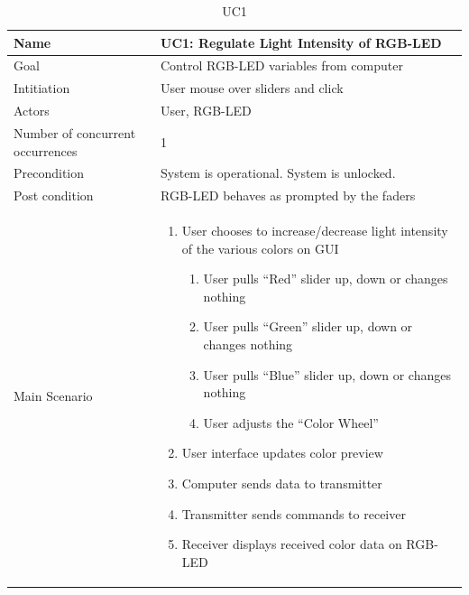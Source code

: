 \documentclass[oneside]{memoir}
\begin{document}
\begin{table}[]
\centering
\caption{UC1}
\label{my-label}
\begin{tabularx}{\textwidth}{|l X|} 
\hline
Name                             & UC1: Regulate Light Intensity of RGB-LED   \\ \hline
Goal                             & Control RGB-LED variables from computer    \\ \hline
Intitiation                      & User mouse over sliders and click          \\ \hline
Actors                           & User, RGB-LED                              \\ \hline
Number of concurrent occurrences & 1                                          \\ \hline
Precondition                     & System is operational. System is unlocked. \\ \hline
Post condition                   & RGB-LED behaves as prompted by the faders  \\ \hline
Main Scenario                    & 
                                 
                                    \begin{enumerate} 
                                 \item User chooses to increase/decrease light intensity of the various colors on GUI 
                              \begin{enumerate}[label*=\arabic*.]
                                \item User pulls “Red” slider up, down or changes nothing
                                \item User pulls “Green” slider up, down or changes nothing
                                \item User pulls “Blue” slider up, down or changes nothing
                                \item User adjusts the “Color Wheel”
                                        \end{enumerate}
                                \item User interface updates color preview
                                \item Computer sends data to transmitter
                                \item Transmitter sends commands to receiver
                                \item Receiver displays received color data on RGB-LED
                                 \end{enumerate} 
                                 \\     \hline
\end{tabularx}
\end{table}
\end{document}
